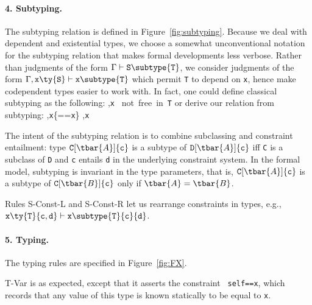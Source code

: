 \paragraph{4. Subtyping.} The subtyping relation is defined in Figure~\ref{fig:subtyping}.
Because we deal with dependent and existential types, we choose a somewhat unconventional notation for the subtyping relation that makes formal developments less verbose. Rather than judgments of the form $\Gamma\vdash{\tt S}\subtype{\tt T}$, we consider judgments of the form $\Gamma,{\tt x}\ty{\tt S}\vdash{\tt x}\subtype{\tt T}$ which permit {\tt T} to depend on {\tt x}, hence make codependent types easier to work with. In fact, one could define classical subtyping as the following:
\vspace{-\medskipamount}
\infrule
	{ \andalso \Gamma,{\tt x} ~\rm not~free~in~{\tt T}}
	{\Gamma{}}
\vspace{-\medskipamount}
or derive our relation from subtyping:
\vspace{-\medskipamount}
\infrule
	{\Gamma,{\tt x}\{\self=={\tt x}\}}
	{\Gamma,{\tt x}}
\vspace{-\medskipamount}

The intent of the subtyping relation is to combine subclassing and constraint entailment: type ${\tt C}[\tbar{A}]\{{\tt c}\}$ is a subtype of ${\tt D}[\tbar{A}]\{{\tt c}\}$ iff {\tt C} is a subclass of {\tt D} and {\tt c} entails {\tt d} in the underlying constraint system. In the formal model, subtyping is invariant in the type parameters, that is, ${\tt C}[\tbar{A}]\{{\tt c}\}$ is a subtype of ${\tt C}[\tbar{B}]\{{\tt c}\}$ only if $\tbar{A}=\tbar{B}$.

Rules {\sc S-Const-L} and {\sc S-Const-R} let us rearrange constraints in types, e.g., ${\tt x}\ty{\tt T}\{{\tt c},{\tt d}\}\vdash {\tt x}\subtype {\tt T}\{{\tt c}\}\{{\tt d}\}$.


\paragraph{5. Typing.} The typing rules are specified in Figure~\ref{fig:FX}.

{\sc T-Var} is as expected, except that it asserts the constraint {\tt
self==x}, which records that any value of this type is known
statically to be equal to {\tt x}. %

